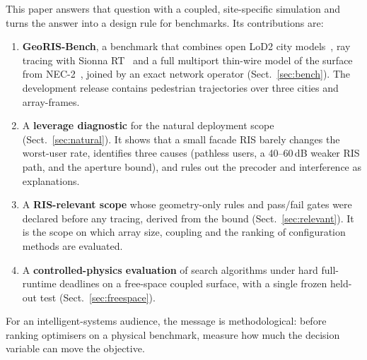 \documentclass[runningheads]{llncs}
\begin{document}
This paper answers that question with a coupled, site-specific simulation and turns the answer into a design rule for benchmarks. Its contributions are:
\begin{enumerate}
\item \textbf{GeoRIS-Bench}, a benchmark that combines open LoD2 city models~\cite{bavaria2025lod2,peters2022automated}, ray tracing with Sionna RT~\cite{hoydis2023sionna} and a full multiport thin-wire model of the surface from NEC-2~\cite{burke1981nec,pynec}, joined by an exact network operator (Sect.~\ref{sec:bench}). The development release contains  pedestrian trajectories over three cities and  array-frames.
\item A \textbf{leverage diagnostic} for the natural deployment scope (Sect.~\ref{sec:natural}). It shows that a small facade RIS barely changes the worst-user rate, identifies three causes (pathless users, a 40--60\,dB weaker RIS path, and the aperture bound), and rules out the precoder and interference as explanations.
\item A \textbf{RIS-relevant scope} whose geometry-only rules and pass/fail gates were declared before any tracing, derived from the bound (Sect.~\ref{sec:relevant}). It is the scope on which array size, coupling and the ranking of configuration methods are evaluated.
\item A \textbf{controlled-physics evaluation} of search algorithms under hard full-runtime deadlines on a free-space coupled surface, with a single frozen held-out test (Sect.~\ref{sec:freespace}).
\end{enumerate}
For an intelligent-systems audience, the message is methodological: before ranking optimisers on a physical benchmark, measure how much the decision variable can move the objective.

\end{document}
